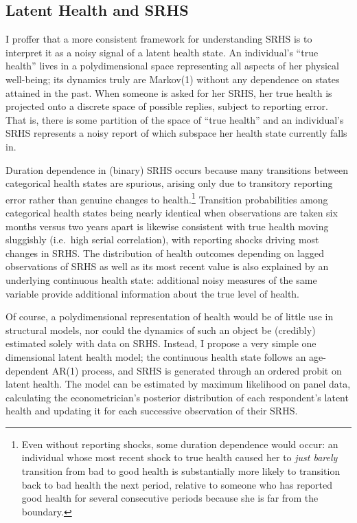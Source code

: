 \documentclass[12pt,pdftex,letterpaper]{article}
\begin{document}
\subsection{Latent Health and SRHS}

I proffer that a more consistent framework for understanding SRHS is to interpret it as a noisy signal of a latent health state.  An individual's ``true health'' lives in a polydimensional space representing all aspects of her physical well-being; its dynamics truly are Markov(1) without any dependence on states attained in the past.  When someone is asked for her SRHS, her true health is projected onto a discrete space of possible replies, subject to reporting error.  That is, there is some partition of the space of ``true health'' and an individual's SRHS represents a noisy report of which subspace her health state currently falls in.

Duration dependence in (binary) SRHS occurs because many transitions between categorical health states are spurious, arising only due to transitory reporting error rather than genuine changes to health.\footnote{Even without reporting shocks, some duration dependence would occur: an individual whose most recent shock to true health caused her to \textit{just barely} transition from bad to good health is substantially more likely to transition back to bad health the next period, relative to someone who has reported good health for several consecutive periods because she is far from the boundary.}  Transition probabilities among categorical health states being nearly identical when observations are taken six months versus two years apart is likewise consistent with true health moving sluggishly (i.e.\ high serial correlation), with reporting shocks driving most changes in SRHS.  The distribution of health outcomes depending on lagged observations of SRHS as well as its most recent value is also explained by an underlying continuous health state: additional noisy measures of the same variable provide additional information about the true level of health.

Of course, a polydimensional representation of health would be of little use in structural models, nor could the dynamics of such an object be (credibly) estimated solely with data on SRHS.  Instead, I propose a very simple one dimensional latent health model; the continuous health state follows an age-dependent AR(1) process, and SRHS is generated through an ordered probit on latent health.  The model can be estimated by maximum likelihood on panel data, calculating the econometrician's posterior distribution of each respondent's latent health and updating it for each successive observation of their SRHS.
\end{document}
